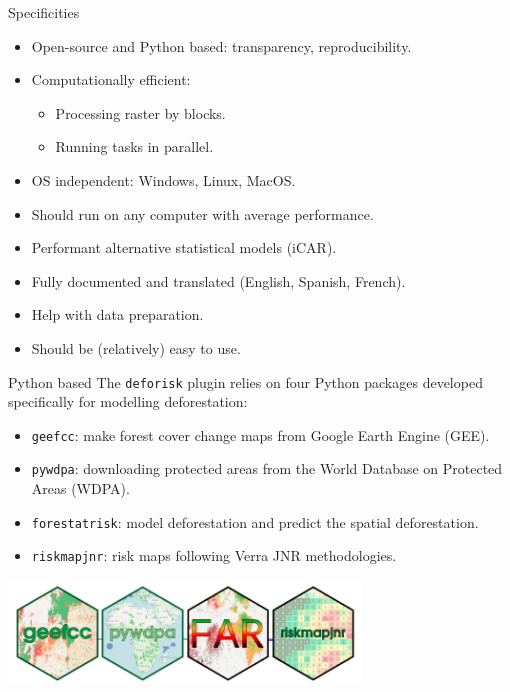 \documentclass[10pt,table,dvipsnames,compress]{beamer}
\begin{document}
\begin{frame}[label={sec:org670f662}]{Specificities}
\begin{itemize}
\item Open-source and Python based: transparency, reproducibility.
\item Computationally efficient:
\begin{itemize}
\item Processing raster by blocks.
\item Running tasks in parallel.
\end{itemize}
\item OS independent: Windows, Linux, MacOS.
\item Should run on any computer with average performance.
\item Performant alternative statistical models (iCAR).
\item Fully documented and translated (English, Spanish, French).
\item Help with data preparation.
\item Should be (relatively) easy to use.
\end{itemize}
\end{frame}

\begin{frame}[label={sec:orgad092f5},fragile]{Python based}
 The \texttt{deforisk} plugin relies on four Python packages developed specifically for modelling deforestation:

\begin{itemize}
\item \texttt{geefcc}: make forest cover change maps from Google Earth Engine (GEE).
\item \texttt{pywdpa}: downloading protected areas from the World Database on Protected Areas (WDPA).
\item \texttt{forestatrisk}: model deforestation and predict the spatial deforestation.
\item \texttt{riskmapjnr}: risk maps following Verra JNR methodologies.
\end{itemize}

\begin{center}
\includegraphics[width=0.7\textwidth]{figs/logos-packages.png}
\end{center}
\end{frame}
\end{document}

